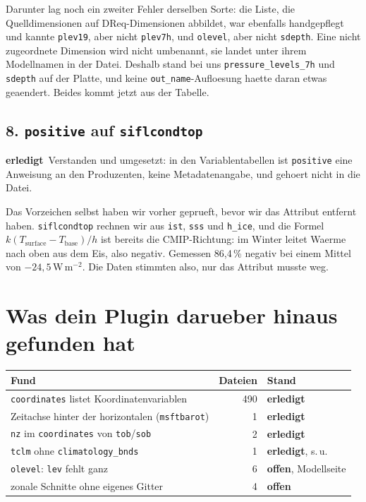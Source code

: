 \documentclass[11pt,a4paper]{article}
\newcommand{\code}[1]{\texttt{\small #1}}
\newcommand{\ok}{\textcolor{green!45!black}{\textbf{erledigt}}}
\newcommand{\offen}{\textcolor{orange!75!black}{\textbf{offen}}}
\begin{document}
Darunter lag noch ein zweiter Fehler derselben Sorte: die Liste, die Quelldimensionen
auf DReq-Dimensionen abbildet, war ebenfalls handgepflegt und kannte \code{plev19},
aber nicht \code{plev7h}, und \code{olevel}, aber nicht \code{sdepth}. Eine nicht
zugeordnete Dimension wird nicht umbenannt, sie landet unter ihrem Modellnamen in der
Datei. Deshalb stand bei uns \code{pressure\_levels\_7h} und \code{sdepth} auf der
Platte, und keine \code{out\_name}-Aufloesung haette daran etwas geaendert. Beides
kommt jetzt aus der Tabelle.

\subsection*{8. \code{positive} auf \code{siflcondtop}}
\ok\ Verstanden und umgesetzt: in den Variablentabellen ist \code{positive} eine
Anweisung an den Produzenten, keine Metadatenangabe, und gehoert nicht in die Datei.

Das Vorzeichen selbst haben wir vorher geprueft, bevor wir das Attribut entfernt
haben. \code{siflcondtop} rechnen wir aus \code{ist}, \code{sss} und \code{h\_ice},
und die Formel $k(T_\mathrm{surface} - T_\mathrm{base})/h$ ist bereits die
CMIP-Richtung: im Winter leitet Waerme nach oben aus dem Eis, also negativ. Gemessen
86{,}4\,\% negativ bei einem Mittel von $-24{,}5$\,W\,m$^{-2}$. Die Daten stimmten
also, nur das Attribut musste weg.

\section{Was dein Plugin darueber hinaus gefunden hat}

\begin{center}
\begin{tabular}{lrl}
\toprule
\textbf{Fund} & \textbf{Dateien} & \textbf{Stand} \\
\midrule
\code{coordinates} listet Koordinatenvariablen & 490 & \ok \\
Zeitachse hinter der horizontalen (\code{msftbarot}) & 1 & \ok \\
\code{nz} im \code{coordinates} von \code{tob}/\code{sob} & 2 & \ok \\
\code{tclm} ohne \code{climatology\_bnds} & 1 & \ok, s.\,u. \\
\code{olevel}: \code{lev} fehlt ganz & 6 & \offen, Modellseite \\
zonale Schnitte ohne eigenes Gitter & 4 & \offen \\
\bottomrule
\end{tabular}
\end{center}
\end{document}
